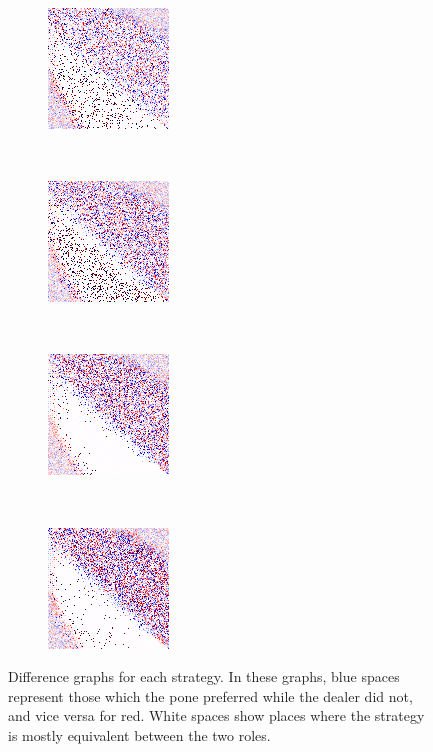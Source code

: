 \begin{figure}
	\begin{subfigure}[t]{0.22\textwidth}
		\includegraphics[width=\stratgraphwidth]{images/findings/round1/diff/crib_min_avg.png}
		\caption{\cribminavg}
	\end{subfigure}
	~
	\begin{subfigure}[t]{0.22\textwidth}
		\includegraphics[width=\stratgraphwidth]{images/findings/round1/diff/pegging_max_avg_gained.png}
		\caption{\peggingmaxavggained}
	\end{subfigure}
~
	\begin{subfigure}[t]{0.22\textwidth}
		\includegraphics[width=\stratgraphwidth]{images/findings/round1/diff/pegging_max_med_gained.png}
		\caption{\peggingmaxmedgained}
	\end{subfigure}
	~
	\begin{subfigure}[t]{0.22\textwidth}
		\includegraphics[width=\stratgraphwidth]{images/findings/round1/diff/pegging_min_avg_given.png}
		\caption{\peggingminavggiven}
	\end{subfigure}

\caption{
	Difference graphs for each strategy.
	In these graphs,
	blue spaces represent those which the pone preferred
		while the dealer did not,
	and vice versa for red.
	White spaces show places where the strategy is 
	mostly equivalent between the two roles.
}
\label{fig:r1-diff}
\end{figure}

